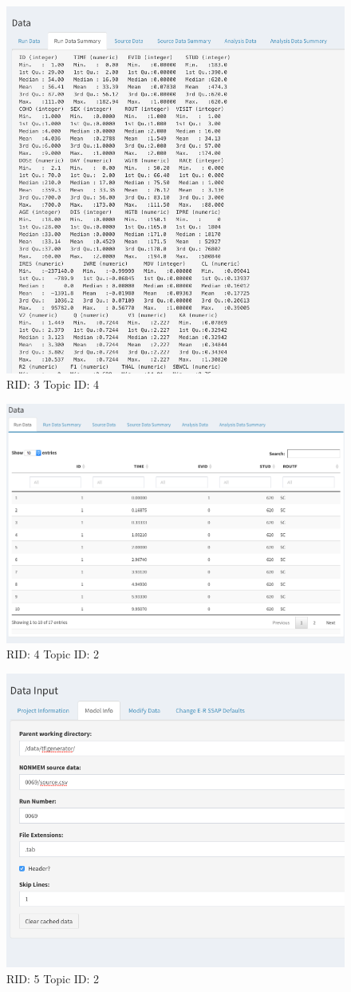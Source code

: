 \documentclass{article}
\begin{document}
\begin{figure}[hp]
\includegraphics[width=.8\textwidth]{screencaps/3-4-1.png}
\caption{RID: 3 Topic ID: 4}
\end{figure}

\newpage
\begin{figure}[hp]
\includegraphics[width=.8\textwidth]{screencaps/4-2-1.png}
\caption{RID: 4 Topic ID: 2}
\end{figure}
\newpage
\begin{figure}[hp]
\includegraphics[width=.8\textwidth]{screencaps/5-2-1.png}
\caption{RID: 5 Topic ID: 2}
\end{figure}
\end{document}

